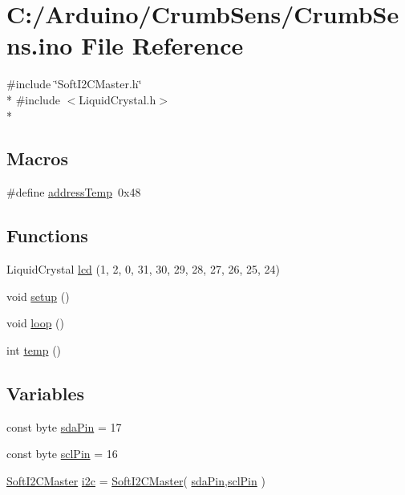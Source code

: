 \hypertarget{_crumb_sens_8ino}{\section{C\-:/\-Arduino/\-Crumb\-Sens/\-Crumb\-Sens.ino File Reference}
\label{_crumb_sens_8ino}
}
{\ttfamily \#include \char`\"{}Soft\-I2\-C\-Master.\-h\char`\"{}}\\*
{\ttfamily \#include $<$Liquid\-Crystal.\-h$>$}\\*
\subsection*{Macros}
\begin{DoxyCompactItemize}
\item 
\#define \hyperlink{_crumb_sens_8ino_a7c9dedced025ba516393918592e3d36b}{address\-Temp}~0x48
\end{DoxyCompactItemize}
\subsection*{Functions}
\begin{DoxyCompactItemize}
\item 
Liquid\-Crystal \hyperlink{_crumb_sens_8ino_a59e74bd9e0aa6989df5d34630db59c8d}{lcd} (1, 2, 0, 31, 30, 29, 28, 27, 26, 25, 24)
\item 
void \hyperlink{_crumb_sens_8ino_a4fc01d736fe50cf5b977f755b675f11d}{setup} ()
\item 
void \hyperlink{_crumb_sens_8ino_afe461d27b9c48d5921c00d521181f12f}{loop} ()
\item 
int \hyperlink{_crumb_sens_8ino_a9a90ccf6fa5cb74d44133a5ee0bff148}{temp} ()
\end{DoxyCompactItemize}
\subsection*{Variables}
\begin{DoxyCompactItemize}
\item 
const byte \hyperlink{_crumb_sens_8ino_afa6793708eee64e6f0f328cbc61b5b22}{sda\-Pin} = 17
\item 
const byte \hyperlink{_crumb_sens_8ino_a22f7ca6ca71734a01a826f4abd36e13e}{scl\-Pin} = 16
\item 
\hyperlink{class_soft_i2_c_master}{Soft\-I2\-C\-Master} \hyperlink{_crumb_sens_8ino_a96d6210f68eedf93194e99ebe63ebdf2}{i2c} = \hyperlink{class_soft_i2_c_master}{Soft\-I2\-C\-Master}( \hyperlink{_crumb_sens_8ino_afa6793708eee64e6f0f328cbc61b5b22}{sda\-Pin},\hyperlink{_crumb_sens_8ino_a22f7ca6ca71734a01a826f4abd36e13e}{scl\-Pin} )
\end{DoxyCompactItemize}


